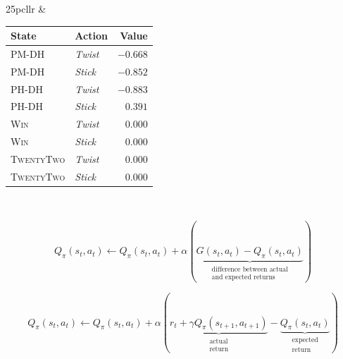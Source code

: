 \documentclass[xcolor={table}]{beamer}
\newcommand{\Midrule}[0]{\hline}
\newcommand{\Botrule}[0]{\hline}
\newcommand{\rlState}[1]{\textsc{#1}} %
\newcommand{\rlAction}[1]{\textit{#1}} %
\begin{document}
\begin{frame}
\begin{table}[htb]
\begin{scriptsize}
{\begin{tabular*}{25pc}{llr}
&
\begin{minipage}{0.28\textwidth}
\raggedleft
{\setlength{\tabcolsep}{0.7em}
\begin{tabular*}{10pc}{@{\extracolsep{\fill}} l l r @{}}
State & Action & Value \\
\Midrule
\rlState{PM-DH} & \rlAction{Twist} & $-0.668$ \\
\rlState{PM-DH} & \rlAction{Stick} & $-0.852$ \\
\rlState{PH-DH} & \rlAction{Twist} & $-0.883$ \\
\rlState{PH-DH} & \rlAction{Stick} & $0.391$ \\
\rlState{Win} & \rlAction{Twist} & $0.000$ \\ 
\rlState{Win} & \rlAction{Stick} & $0.000$ \\  
\rlState{TwentyTwo} & \rlAction{Twist} & $0.000$ \\ 
\rlState{TwentyTwo} & \rlAction{Stick} & $0.000$ \\  
\Botrule
\end{tabular*}
}
\end{minipage}\\
\end{tabular*}
}{}
\end{scriptsize}
\end{table}
\end{frame} 



 \begin{frame} 
\begin{equation}
Q_{\pi}\left(s_t, a_t\right) \leftarrow Q_{\pi}\left(s_t, a_t\right) + \alpha(\underbrace{G\left(s_t, a_t\right) - Q_{\pi}\left(s_t, a_t\right)}_{\substack{
		\text{difference between actual}\\
		\text{and expected returns}
	}})
\label{eqn:td_learning_basic}
\end{equation}
\end{frame} 



 \begin{frame} 
\begin{equation}
Q_{\pi}\left(s_t, a_t\right) \leftarrow Q_{\pi}\left(s_t, a_t\right) + \alpha(\underbrace{r_t + \gamma  Q_{\pi}\left(s_{t+1}, a_{t+1}\right)}_{
	\substack{
		\text{actual}\\
		\text{return}
	}} - \underbrace{Q_{\pi}\left(s_t, a_t\right)}_{\substack{
		\text{expected}\\
		\text{return}
	}})
\label{eqn:td_learning}
\end{equation}
\end{frame} 
\end{document}
